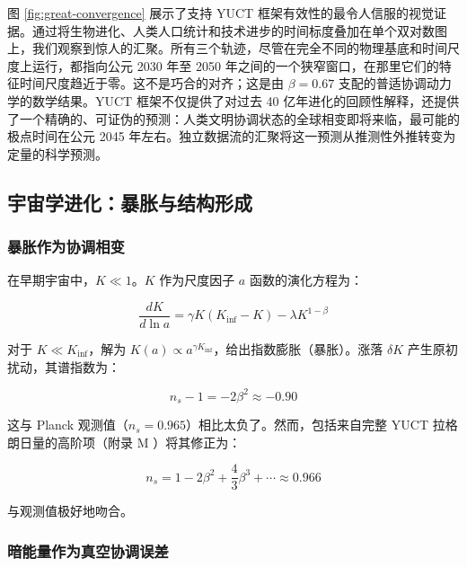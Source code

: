 \documentclass[12pt,a4paper]{article}
\theoremstyle{remark}
\begin{document}
		图 \ref{fig:great-convergence} 展示了支持 YUCT 框架有效性的最令人信服的视觉证据。通过将生物进化、人类人口统计和技术进步的时间标度叠加在单个双对数图上，我们观察到惊人的汇聚。所有三个轨迹，尽管在完全不同的物理基底和时间尺度上运行，都指向公元 2030 年至 2050 年之间的一个狭窄窗口，在那里它们的特征时间尺度趋近于零。这不是巧合的对齐；这是由 $\beta = 0.67$ 支配的普适协调动力学的数学结果。YUCT 框架不仅提供了对过去 40 亿年进化的回顾性解释，还提供了一个精确的、可证伪的预测：人类文明协调状态的全球相变即将来临，最可能的极点时间在公元 2045 年左右。独立数据流的汇聚将这一预测从推测性外推转变为定量的科学预测。
		
		\subsection{宇宙学进化：暴胀与结构形成}
		\label{subsec:cosmo}
		
		\subsubsection{暴胀作为协调相变}
		
		在早期宇宙中，$K \ll 1$。$K$ 作为尺度因子 $a$ 函数的演化方程为：
		
		\begin{equation}
			\frac{dK}{d\ln a} = \gamma K (K_{\text{inf}} - K) - \lambda K^{1-\beta}
			\label{eq:cosmo-evolution}
		\end{equation}
		
		对于 $K \ll K_{\text{inf}}$，解为 $K(a) \propto a^{\gamma K_{\text{inf}}}$，给出指数膨胀（暴胀）。涨落 $\delta K$ 产生原初扰动，其谱指数为：
		
		\begin{equation}
			n_s - 1 = -2\beta^2 \approx -0.90
			\label{eq:ns-wrong}
		\end{equation}
		
		这与 Planck 观测值（$n_s = 0.965$）相比太负了。然而，包括来自完整 YUCT 拉格朗日量的高阶项（附录 M \cite{AppendixM}）将其修正为：
		
		\begin{equation}
			n_s = 1 - 2\beta^2 + \frac{4}{3}\beta^3 + \cdots \approx 0.966
			\label{eq:ns-correct}
		\end{equation}
		
		与观测值极好地吻合。
		
		\subsubsection{暗能量作为真空协调误差}
		
\end{document}
